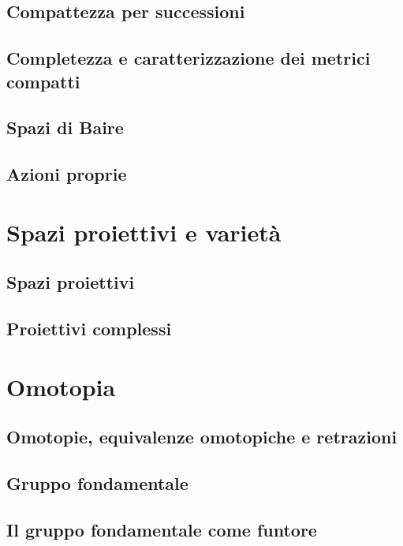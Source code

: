 \documentclass{article}
\begin{document}
\subsection{Compattezza per successioni}


\subsection{Completezza e caratterizzazione dei metrici compatti}


\subsection{Spazi di Baire}


\subsection{Azioni proprie}


\section{Spazi proiettivi e varietà}

\subsection{Spazi proiettivi}


\subsection{Proiettivi complessi}


\section{Omotopia}

\subsection{Omotopie, equivalenze omotopiche e retrazioni}


\subsection{Gruppo fondamentale}


\subsection{Il gruppo fondamentale come funtore}

\end{document}
